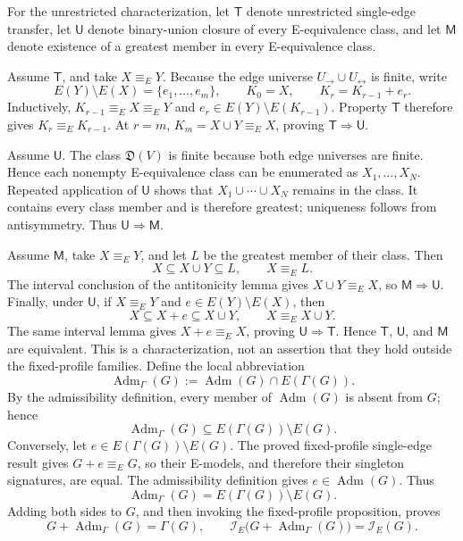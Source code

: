 For the unrestricted characterization, let \(\mathsf T\) denote unrestricted single-edge transfer, let \(\mathsf U\) denote binary-union closure of every E-equivalence class, and let \(\mathsf M\) denote existence of a greatest member in every E-equivalence class.

Assume \(\mathsf T\), and take \(X\equiv_EY\).  Because the edge universe \(U_{\to}\cup U_{\leftrightarrow}\) is finite, write
\[
 E(Y)\setminus E(X)=\{e_1,\ldots,e_m\},\qquad
 K_0=X,\qquad K_r=K_{r-1}+e_r.
\]
Inductively, \(K_{r-1}\equiv_EX\equiv_EY\) and \(e_r\in E(Y)\setminus E(K_{r-1})\).  Property \(\mathsf T\) therefore gives \(K_r\equiv_EK_{r-1}\).  At \(r=m\), \(K_m=X\cup Y\equiv_EX\), proving \(\mathsf T\Rightarrow\mathsf U\).

Assume \(\mathsf U\).  The class \(\mathfrak D(V)\) is finite because both edge universes are finite.  Hence each nonempty E-equivalence class can be enumerated as \(X_1,\ldots,X_N\).  Repeated application of \(\mathsf U\) shows that \(X_1\cup\cdots\cup X_N\) remains in the class.  It contains every class member and is therefore greatest; uniqueness follows from antisymmetry.  Thus \(\mathsf U\Rightarrow\mathsf M\).

Assume \(\mathsf M\), take \(X\equiv_EY\), and let \(L\) be the greatest member of their class.  Then
\[
 X\subseteq X\cup Y\subseteq L,
 \qquad X\equiv_EL.
\]
The interval conclusion of the antitonicity lemma gives \(X\cup Y\equiv_EX\), so \(\mathsf M\Rightarrow\mathsf U\).  Finally, under \(\mathsf U\), if \(X\equiv_EY\) and \(e\in E(Y)\setminus E(X)\), then
\[
 X\subseteq X+e\subseteq X\cup Y,
 \qquad X\equiv_E X\cup Y.
\]
The same interval lemma gives \(X+e\equiv_EX\), proving \(\mathsf U\Rightarrow\mathsf T\).  Hence \(\mathsf T\), \(\mathsf U\), and \(\mathsf M\) are equivalent.  This is a characterization, not an assertion that they hold outside the fixed-profile families.
Define the local abbreviation
\[
 \operatorname{Adm}_{\Gamma}(G)
 :=\operatorname{Adm}(G)\cap E(\Gamma(G)).
\]
By the admissibility definition, every member of \(\operatorname{Adm}(G)\) is absent from \(G\); hence
\[
 \operatorname{Adm}_{\Gamma}(G)
 \subseteq E(\Gamma(G))\setminus E(G).
\]
Conversely, let \(e\in E(\Gamma(G))\setminus E(G)\).  The proved fixed-profile single-edge result gives \(G+e\equiv_EG\), so their E-models, and therefore their singleton signatures, are equal.  The admissibility definition gives \(e\in\operatorname{Adm}(G)\).  Thus
\[
 \operatorname{Adm}_{\Gamma}(G)=E(\Gamma(G))\setminus E(G).
\]
Adding both sides to \(G\), and then invoking the fixed-profile proposition, proves
\[
 G+\operatorname{Adm}_{\Gamma}(G)=\Gamma(G),
 \qquad
 \mathcal I_E\bigl(G+\operatorname{Adm}_{\Gamma}(G)\bigr)=\mathcal I_E(G).
\]

